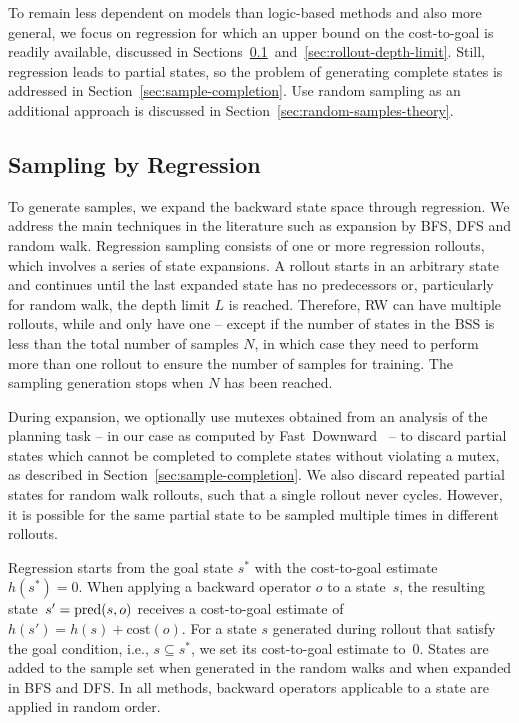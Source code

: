 To remain less dependent on models than logic-based methods and also more general, we focus on regression for which an upper bound on the cost-to-goal is readily available, discussed in Sections~\ref{sec:sampling-generation}~and~\ref{sec:rollout-depth-limit}. Still, regression leads to partial states, so the problem of generating complete states is addressed in Section~\ref{sec:sample-completion}. Use random sampling as an additional approach is discussed in Section~\ref{sec:random-samples-theory}.

\subsection{Sampling by Regression}
\label{sec:sampling-generation}

To generate samples, we expand the backward state space through regression. We address the main techniques in the literature such as expansion by BFS, DFS and random walk. Regression sampling consists of one or more regression rollouts, which involves a series of state expansions. A rollout starts in an arbitrary state and continues until the last expanded state has no predecessors or, particularly for random walk, the depth limit $L$ is reached. Therefore, RW can have multiple rollouts, while \bfs and \dfs only have one -- except if the number of states in the BSS is less than the total number of samples $N$, in which case they need to perform more than one rollout to ensure the number of samples for training. The sampling generation stops when $N$ has been reached.

During expansion, we optionally use mutexes obtained from an analysis of the planning task -- in our case as computed by Fast~Downward~\cite{Helmert/2006} -- to discard partial states which cannot be completed to complete states without violating a mutex, as described in Section~\ref{sec:sample-completion}. We also discard repeated partial states for random walk rollouts, such that a single rollout never cycles. However, it is possible for the same partial state to be sampled multiple times in different rollouts.

Regression starts from the goal state $s^*$ with the cost-to-goal estimate~$h(s^*)=0$. When applying a backward operator $o$ to a state~$s$, the resulting state~$s' = \operatorname{pred}(s, o)$ receives a cost-to-goal estimate of $h(s') = h(s) + \text{cost}(o)$. For a state $s$ generated during rollout that satisfy the goal condition, i.e., $s \subseteq s^*$, we set its cost-to-goal estimate to~$0$. States are added to the sample set when generated in the random walks and when expanded in BFS and DFS. In all methods, backward operators applicable to a state are applied in random order.


